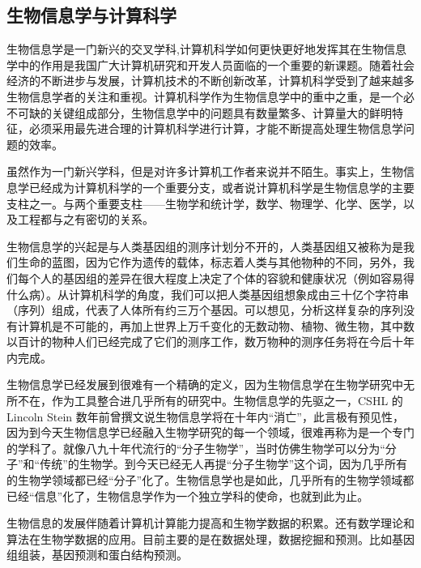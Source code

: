 \documentclass{article}
\begin{document}
\subsection{生物信息学与计算科学}
\par 生物信息学是一门新兴的交叉学科,计算机科学如何更快更好地发挥其在生物信息学中的作用是我国广大计算机研究和开发人员面临的一个重要的新课题。随着社会经济的不断进步与发展，计算机技术的不断创新改革，计算机科学受到了越来越多生物信息学者的关注和重视。计算机科学作为生物信息学中的重中之重，是一个必不可缺的关键组成部分，生物信息学中的问题具有数量繁多、计算量大的鲜明特征，必须采用最先进合理的计算机科学进行计算，才能不断提高处理生物信息学问题的效率。\par
虽然作为一门新兴学科，但是对许多计算机工作者来说并不陌生。事实上，生物信息学已经成为计算机科学的一个重要分支，或者说计算机科学是生物信息学的主要支柱之一。与两个重要支柱——生物学和统计学，数学、物理学、化学、医学，以及工程都与之有密切的关系。\par
生物信息学的兴起是与人类基因组的测序计划分不开的，人类基因组又被称为是我们生命的蓝图，因为它作为遗传的载体，标志着人类与其他物种的不同，另外，我们每个人的基因组的差异在很大程度上决定了个体的容貌和健康状况（例如容易得什么病）。从计算机科学的角度，我们可以把人类基因组想象成由三十亿个字符串（序列）组成，代表了人体所有约三万个基因。可以想见，分析这样复杂的序列没有计算机是不可能的，再加上世界上万千变化的无数动物、植物、微生物，其中数以百计的物种人们已经完成了它们的测序工作，数万物种的测序任务将在今后十年内完成。\par
生物信息学已经发展到很难有一个精确的定义，因为生物信息学在生物学研究中无所不在，作为工具整合进几乎所有的研究中。生物信息学的先驱之一，CSHL 的 Lincoln Stein 数年前曾撰文说生物信息学将在十年内“消亡”，此言极有预见性，因为到今天生物信息学已经融入生物学研究的每一个领域，很难再称为是一个专门的学科了。就像八九十年代流行的“分子生物学”，当时仿佛生物学可以分为“分子”和“传统”的生物学。到今天已经无人再提“分子生物学”这个词，因为几乎所有的生物学领域都已经“分子”化了。生物信息学也是如此，几乎所有的生物学领域都已经“信息”化了，生物信息学作为一个独立学科的使命，也就到此为止。\par
生物信息的发展伴随着计算机计算能力提高和生物学数据的积累。还有数学理论和算法在生物学数据的应用。目前主要的是在数据处理，数据挖掘和预测。比如基因组组装，基因预测和蛋白结构预测。\par
\end{document}
